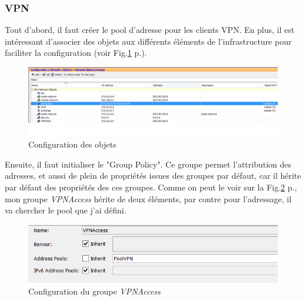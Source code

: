 \subsubsection{VPN}
Tout d'abord, il faut créer le pool d'adresse pour les clients VPN.
En plus, il est intéressant d'associer des objets aux différents éléments de l'infrastructure pour faciliter la configuration (voir Fig.\ref{fig:objectCisco} p.\pageref{fig:objectCisco}).
\begin{figure}[ht]
	\centering
	\includegraphics[width=16cm]{Cisco/objects.png}
	\caption{Configuration des objets}
	\label{fig:objectCisco}
\end{figure}

Ensuite, il faut initialiser le "Group Policy".
Ce groupe permet l'attribution des adresses, et aussi de plein de propriétés issues des groupes par défaut, car il hérite par défaut des propriétés des ces groupes. 
Comme on peut le voir sur la Fig.\ref{fig:gpCisco} p.\pageref{fig:gpCisco}, mon groupe \textit{VPNAccess} hérite de deux éléments, par contre pour l'adressage, il va chercher le pool que j'ai défini. 
\begin{figure}[ht]
	\centering
	\includegraphics{Cisco/GroupPoliciesVPN.png}
	\caption{Configuration du groupe \textit{VPNAccess}}
	\label{fig:gpCisco}
\end{figure}

